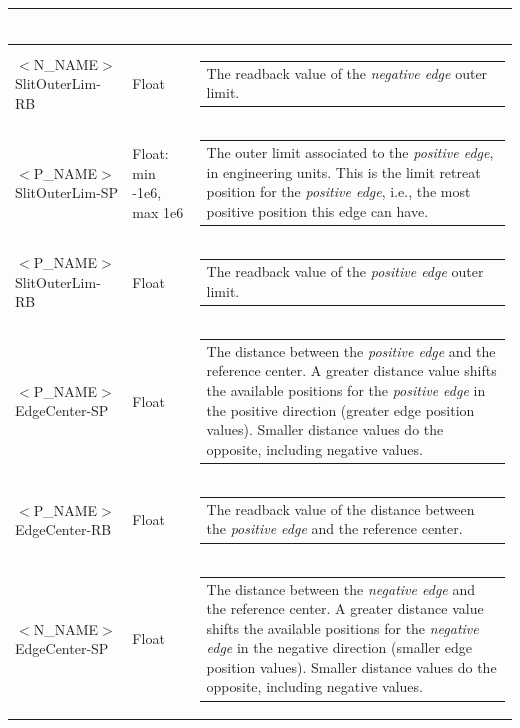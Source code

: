 \documentclass[openany]{article}
\begin{document}
\begin{longtable}{| m{4.5cm} m{2.5cm}  m{7.0cm} |}
\begin{tabular}{@{}m{6cm}@{}}
            \end{tabular} \hypertarget{}{}\\ \hline
        $<$N\_NAME$>$SlitOuterLim-RB & Float & \begin{tabular}{@{}m{6cm}@{}}
                The readback value of the \emph{negative edge} outer limit.
            \end{tabular} \hypertarget{pv:high-outer-lim}{}\\ \hline
        $<$P\_NAME$>$SlitOuterLim-SP & Float: min -1e6, max 1e6 & \begin{tabular}{@{}m{6cm}@{}}
                The outer limit associated to the \emph{positive edge}, in engineering units. This is the limit retreat position for the \emph{positive edge}, i.e., the most positive position this edge can have.
            \end{tabular} \hypertarget{}{}\\ \hline
        $<$P\_NAME$>$SlitOuterLim-RB & Float & \begin{tabular}{@{}m{6cm}@{}}
                The readback value of the \emph{positive edge} outer limit.
            \end{tabular} \hypertarget{pv:positive-edge-center}{}\\ \hline
        $<$P\_NAME$>$EdgeCenter-SP & Float & \begin{tabular}{@{}m{6cm}@{}}
                The distance between the \emph{positive edge} and the reference center. A greater distance value shifts the available positions for the \emph{positive edge} in the positive direction (greater edge position values). Smaller distance values do the opposite, including negative values.
            \end{tabular} \hypertarget{}{}\\ \hline
        $<$P\_NAME$>$EdgeCenter-RB & Float & \begin{tabular}{@{}m{6cm}@{}}
                The readback value of the distance between the \emph{positive edge} and the reference center.
            \end{tabular} \hypertarget{pv:negative-edge-center}{}\\ \hline
        $<$N\_NAME$>$EdgeCenter-SP & Float & \begin{tabular}{@{}m{6cm}@{}}
                The distance between the \emph{negative edge} and the reference center. A greater distance value shifts the available positions for the \emph{negative edge} in the negative direction (smaller edge position values). Smaller distance values do the opposite, including negative values.

\end{tabular}
\end{longtable}
\end{document}
